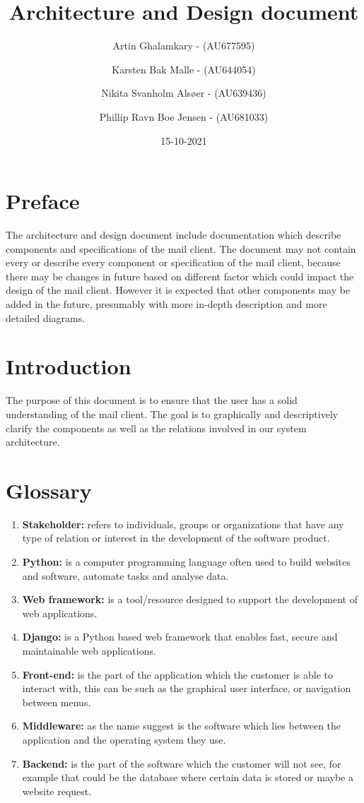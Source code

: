 \documentclass{article}
\title{Architecture and Design document} %
\author{Artin Ghalamkary - (AU677595) \and Karsten Bak Malle - (AU644054) \and Nikita Svanholm Alsøer - (AU639436) \and Phillip Ravn Boe Jensen - (AU681033)}%
\date{15-10-2021}
\begin{document}
\maketitle
\section*{Preface} 
The architecture and design document include documentation which describe components and specifications of the mail client. The document may not contain every or describe every component or specification of the mail client, because there may be changes in future based on different factor which could impact the design of the mail client. However it is expected that other components may be added in the future, presumably with more in-depth description and more detailed diagrams.


\section*{Introduction} 
The purpose of this document is to ensure that the user has a solid understanding of the mail client. The goal is to graphically and descriptively clarify the components as well as the relations involved in our system architecture.

\newpage

\section*{Glossary} 
\begin{enumerate} 
    \item \textbf{Stakeholder:} refers to individuals, groups or organizations that have any type of relation or interest in the development of the software product.
    \item \textbf{Python:} is a computer programming language often used to build websites and software, automate tasks and analyse data. 
    \item \textbf{Web framework:} is a tool/resource designed to support the development of web applications.
    \item \textbf{Django:} is a Python based web framework that enables fast, secure and maintainable web applications. 
    \item \textbf{Front-end:} is the part of the application which the customer is able to interact with, this can be such as the graphical user interface, or navigation between menus.
    \item \textbf{Middleware:} as the name suggest is the software which lies between the application and the operating system they use.
    \item \textbf{Backend:} is the part of the software which the customer will not see, for example that could be the database where certain data is stored or maybe a website request. 
\end{enumerate}
\end{document}
